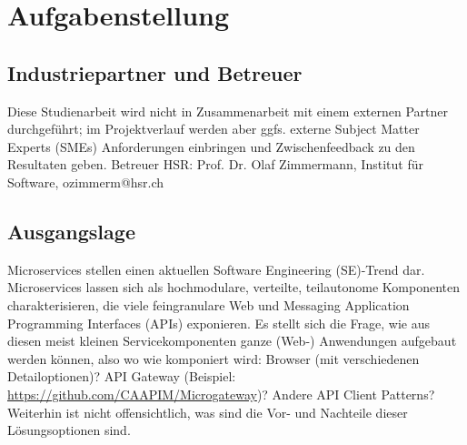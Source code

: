 
 \section{Aufgabenstellung}

 \subsection{Industriepartner und Betreuer}
Diese Studienarbeit wird nicht in Zusammenarbeit mit einem externen Partner durchgeführt; im Projektverlauf werden aber ggfs. externe Subject Matter Experts (SMEs) Anforderungen einbringen und Zwischenfeedback zu den Resultaten geben.   
Betreuer HSR: 
Prof. Dr. Olaf Zimmermann, Institut für Software, ozimmerm@hsr.ch  
\subsection{Ausgangslage}
Microservices stellen einen aktuellen Software Engineering (SE)-Trend dar. Microservices lassen sich als hochmodulare, verteilte, teilautonome Komponenten charakterisieren, die viele feingranulare Web und Messaging Application Programming Interfaces (APIs)  exponieren. 
Es stellt sich die Frage, wie aus diesen meist kleinen Servicekomponenten ganze (Web-) Anwendungen aufgebaut werden können, also wo wie komponiert wird: 
Browser (mit verschiedenen Detailoptionen)? 
API Gateway (Beispiel: \url{https://github.com/CAAPIM/Microgateway})? 
Andere API Client Patterns?
Weiterhin ist nicht offensichtlich, was sind die Vor- und Nachteile dieser Lösungsoptionen sind.
